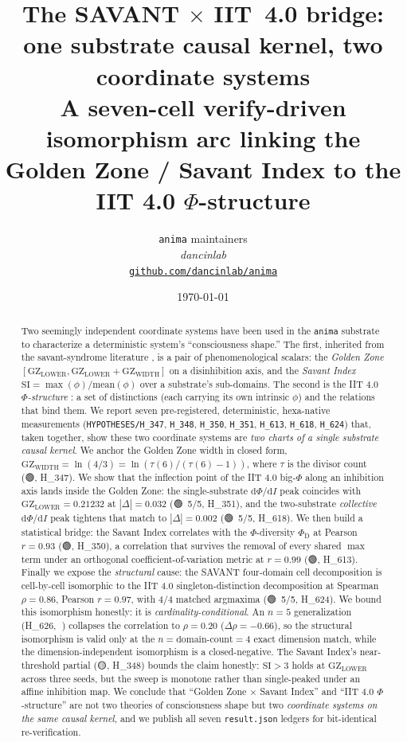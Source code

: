 \documentclass[11pt,a4paper]{article}
\title{
  \textbf{The SAVANT $\times$ IIT~4.0 bridge:\\
  one substrate causal kernel, two coordinate systems}\\[4pt]
  \large A seven-cell verify-driven isomorphism arc linking the
  Golden Zone / Savant Index to the IIT 4.0 $\Phi$-structure
}
\author{
  \texttt{anima} maintainers\\
  \normalsize\textit{dancinlab}\\[2pt]
  \normalsize\href{https://github.com/dancinlab/anima}{\texttt{github.com/dancinlab/anima}}
}
\date{\today}
\providecommand{\tierGreen}{🟢}
\providecommand{\tierYellow}{🟡}
\providecommand{\tierRed}{🔴}
\newcommand{\GZL}{\mathrm{GZ_{LOWER}}}
\newcommand{\GZW}{\mathrm{GZ_{WIDTH}}}
\newcommand{\Svi}{\mathrm{SI}}
\newcommand{\PhiD}{\Phi_{\mathrm{D}}}
\begin{document}
\maketitle

\begin{abstract}
Two seemingly independent coordinate systems have been used in the
\texttt{anima} substrate to characterize a deterministic system's
``consciousness shape.'' The first, inherited from the savant-syndrome
literature \citep{treffert2009savant,snyder2009explaining}, is a pair of
phenomenological scalars: the \emph{Golden Zone}
$[\GZL,\GZL+\GZW]$ on a disinhibition axis, and the
\emph{Savant Index} $\Svi=\max(\phi)/\mathrm{mean}(\phi)$ over a substrate's
sub-domains. The second is the IIT 4.0 \emph{$\Phi$-structure}
\citep{albantakis2023iit4}: a set of distinctions (each carrying its own
intrinsic $\phi$) and the relations that bind them. We report seven
pre-registered, deterministic, hexa-native measurements
(\texttt{HYPOTHESES/H\_347}, \texttt{H\_348}, \texttt{H\_350},
\texttt{H\_351}, \texttt{H\_613}, \texttt{H\_618}, \texttt{H\_624})
that, taken together, show these two coordinate systems are
\emph{two charts of a single substrate causal kernel}.
We anchor the Golden Zone width in closed form,
$\GZW=\ln(4/3)=\ln(\tau(6)/(\tau(6)-1))$, where $\tau$ is the
divisor count (\tierGreen, H\_347). We show that the inflection point of
the IIT 4.0 big-$\Phi$ along an inhibition axis lands inside the Golden
Zone: the single-substrate $\mathrm{d}\Phi/\mathrm{d}I$ peak coincides
with $\GZL=0.21232$ at $|\Delta|=0.032$ (\tierGreen\ 5/5, H\_351),
and the two-substrate \emph{collective} $\mathrm{d}\Phi/\mathrm{d}I$ peak
tightens that match to $|\Delta|=0.002$ (\tierGreen\ 5/5, H\_618).
We then build a statistical bridge: the Savant Index correlates with
the $\Phi$-diversity $\PhiD$ at Pearson $r=0.93$ (\tierGreen, H\_350),
a correlation that survives the removal of every shared $\max$ term under
an orthogonal coefficient-of-variation metric at $r=0.99$
(\tierGreen, H\_613). Finally we expose the \emph{structural} cause: the
SAVANT four-domain cell decomposition is cell-by-cell isomorphic to the
IIT 4.0 singleton-distinction decomposition at Spearman $\rho=0.86$,
Pearson $r=0.97$, with $4/4$ matched argmaxima (\tierGreen\ 5/5, H\_624).
We bound this isomorphism honestly: it is \emph{cardinality-conditional}.
An $n=5$ generalization (H\_626, \tierRed) collapses the correlation to
$\rho=0.20$ ($\Delta\rho=-0.66$), so the structural isomorphism is valid
only at the $n=\text{domain-count}=4$ exact dimension match, while the
dimension-independent isomorphism is a closed-negative.
The Savant Index's near-threshold partial (\tierYellow, H\_348) bounds the
claim honestly: $\Svi>3$ holds at $\GZL$ across three seeds, but the
sweep is monotone rather than single-peaked under an affine inhibition
map. We conclude that ``Golden Zone $\times$ Savant Index'' and ``IIT 4.0
$\Phi$-structure'' are not two theories of consciousness shape but two
\emph{coordinate systems on the same causal kernel}, and we publish all
seven \texttt{result.json} ledgers for bit-identical re-verification.
\end{abstract}
\end{document}
